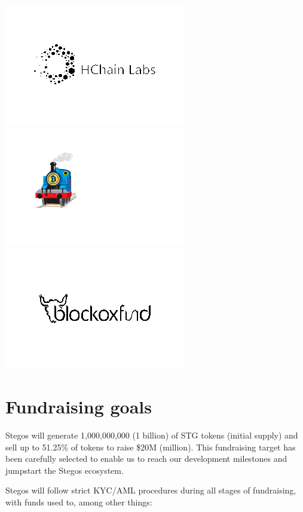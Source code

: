 \documentclass[8pt,fleqn,openany]{book}
\begin{document}
{{\begin{multicols}{7}[\columnsep=1cm]
				\columnbreak
				\includegraphics[scale=\imgscale]{images/partners/partners-5.png}
				\columnbreak
				\includegraphics[scale=\imgscale]{images/partners/partners-6.png}
				\columnbreak
				\includegraphics[scale=\imgscale]{images/partners/partners-7.png}
			\end{multicols}
		}
		
		\section{Fundraising goals}
		Stegos will generate 1,000,000,000 (1 billion) of STG tokens (initial supply) and sell up to 51.25\% of tokens to raise \$20M (million). This fundraising target has been carefully selected to enable us to reach our development milestones and jumpstart the Stegos ecosystem.
		
		Stegos will follow strict KYC/AML procedures during all stages of fundraising, with funds used to, among other things:
		
}
\end{document}
